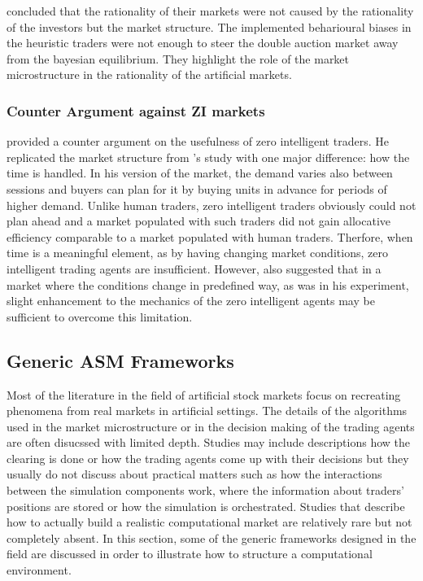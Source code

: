\citeauthor{Jam96} concluded that the rationality of their markets were
not caused by the rationality of the investors but the market structure.
The implemented beharioural biases in the heuristic traders were not enough 
to steer the double auction market away from the bayesian equilibrium.
They highlight the role of the market microstructure in the rationality 
of the artificial markets. 


\subsubsection{Counter Argument against ZI markets}
\citet{Mil08} provided a counter argument on the usefulness of zero
intelligent traders. He replicated the market structure from
\citeauthor{God93}'s study with one major difference: how the 
time is handled. In his version of the market, the demand varies
also between sessions and buyers can plan for it by buying units
in advance for periods of higher demand. Unlike human traders,
zero intelligent traders obviously could not plan ahead and a market
populated with such traders did not gain allocative efficiency comparable
to a market populated with human traders. Therfore, when time is a 
meaningful element, as by having changing market conditions, zero intelligent 
trading agents are insufficient. However, \citeauthor{Mil08} also suggested
that in a market where the conditions change in predefined way, as was in 
his experiment, slight enhancement to the mechanics of the zero intelligent 
agents may be sufficient to overcome this limitation.



\subsection{Generic ASM Frameworks}

Most of the literature in the field of artificial stock markets 
focus on recreating phenomena from real markets in artificial settings.
The details of the algorithms used in the market microstructure or in
the decision making of the trading agents are often disucssed with limited 
depth. Studies may include descriptions how the clearing is done or how the trading agents 
come up with their decisions but they usually do not discuss about practical matters 
such as how the interactions between the simulation components work, where the 
information about traders' positions are stored or how the simulation is orchestrated. 
Studies that describe how to actually build a realistic computational 
market are relatively rare but not completely absent. In this section, some of the 
generic frameworks designed in the field are discussed in order to illustrate how 
to structure a computational environment.


